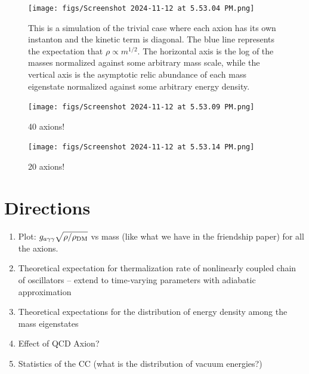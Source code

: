 \documentclass{article}
\begin{document}
\begin{figure}
    \centering
    \texttt{[image: figs/Screenshot 2024-11-12 at 5.53.04 PM.png]}
    \caption{This is a simulation of the trivial case where each axion has its own instanton and the kinetic term is diagonal. The blue line represents the expectation that $\rho\propto m^{1/2}$. The horizontal axis is the log of the masses normalized against some arbitrary mass scale, while the vertical axis is the asymptotic relic abundance of each mass eigenstate normalized against some arbitrary energy density.}
    \label{fig:enter-label}
\end{figure}
\begin{figure}
    \centering
    \texttt{[image: figs/Screenshot 2024-11-12 at 5.53.09 PM.png]}
    \caption{40 axions!}
    \label{fig:enter-label}
\end{figure}
\begin{figure}
    \centering
    \texttt{[image: figs/Screenshot 2024-11-12 at 5.53.14 PM.png]}
    \caption{20 axions!}
    \label{fig:enter-label}
\end{figure}

\section{Directions}
\begin{enumerate}
    \item Plot: $g_{a\gamma\gamma}\sqrt{\rho/\rho_{\rm DM}}$ vs mass (like what we have in the friendship paper) for all the axions.
    \item Theoretical expectation for thermalization rate of nonlinearly coupled chain of oscillators -- extend to time-varying parameters with adiabatic approximation
    \item Theoretical expectations for the distribution of energy density among the mass eigenstates
    \item Effect of QCD Axion?
    \item Statistics of the CC (what is the distribution of vacuum energies?)
\end{enumerate}
\end{document}
